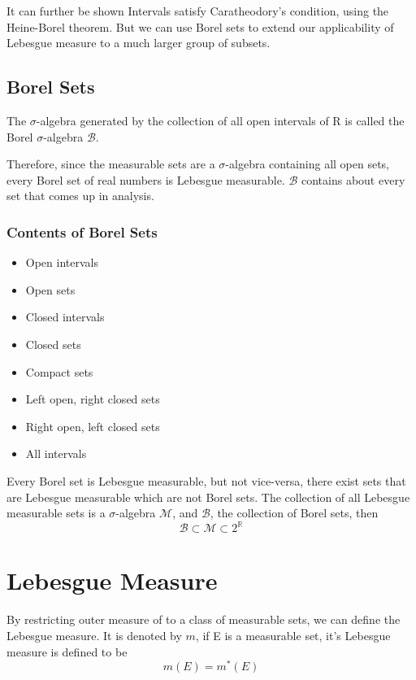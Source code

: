 \documentclass{article}
\begin{document}
It can further be shown Intervals satisfy Caratheodory's condition, using the Heine-Borel theorem. But we can use Borel sets to extend our applicability of Lebesgue measure to a much larger group of subsets.

\subsection{Borel Sets}
The $\sigma$-algebra generated by the collection of all open intervals of R is called the Borel $\sigma$-algebra $\mathscr{B}$.

Therefore, since the measurable sets are a $\sigma$-algebra containing all open sets, every Borel set of real numbers is Lebesgue measurable. $\mathscr{B}$ contains about every set that comes up in analysis.

\subsubsection{Contents of Borel Sets}
\begin{itemize}
    \item Open intervals
    \item Open sets
    \item Closed intervals
    \item Closed sets
    \item Compact sets
    \item Left open, right closed sets
    \item Right open, left closed sets
    \item All intervals
\end{itemize}

Every Borel set is Lebesgue measurable, but not vice-versa, there exist sets that are Lebesgue measurable which are not Borel sets.
The collection of all Lebesgue measurable sets is a $\sigma$-algebra $\mathscr{M}$, and $\mathscr{B}$, the collection of Borel sets, then
$$\mathscr{B} \subset \mathscr{M} \subset 2^{\mathbb{R}} $$


\section{Lebesgue Measure}

By restricting outer measure of to a class of measurable sets, we can define the Lebesgue measure. It is denoted by $m$, if E is a measurable set, it's Lebesgue measure is defined to be
$$m(E)=m^*(E)$$
\end{document}
